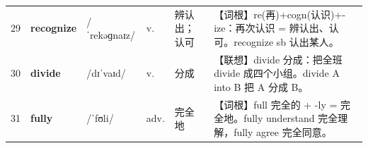 \documentclass[UTF8,a4paper,11pt,oneside]{ctexbook}
\newcommand{\cellword}[1]{{\bfseries\textcolor{wordcol}{#1}}}
\newcommand{\cellipa}[1]{{\footnotesize\textcolor{ipacol}{#1}}}
\newcommand{\cellpos}[1]{\textcolor{poscol}{#1}}
\newcommand{\cellno}[1]{\textcolor{volcolor!75!black}{#1}}
\begin{document}
{\begin{longtable}{@{}C{0.045\textwidth}L{0.155\textwidth}L{0.175\textwidth}C{0.070\textwidth}L{0.180\textwidth}L{0.282\textwidth}@{}}
 \cellno{29} & \cellword{recognize} & \cellipa{/ˈrekəɡnaɪz/} & \cellpos{v.} & 辨认出；认可 & \textcolor{tagRoot}{【词根】}re(再)+cogn(认识)+-ize：再次认识 = 辨认出、认可。recognize sb 认出某人。 \\
\cellno{30} & \cellword{divide} & \cellipa{/dɪˈvaɪd/} & \cellpos{v.} & 分成 & \textcolor{tagAssoc}{【联想】}divide 分成：把全班 divide 成四个小组。divide A into B 把 A 分成 B。 \\
 \cellno{31} & \cellword{fully} & \cellipa{/ˈfʊli/} & \cellpos{adv.} & 完全地 & \textcolor{tagRoot}{【词根】}full 完全的 + -ly = 完全地。fully understand 完全理解，fully agree 完全同意。 \\
\end{longtable}
}

\end{document}
